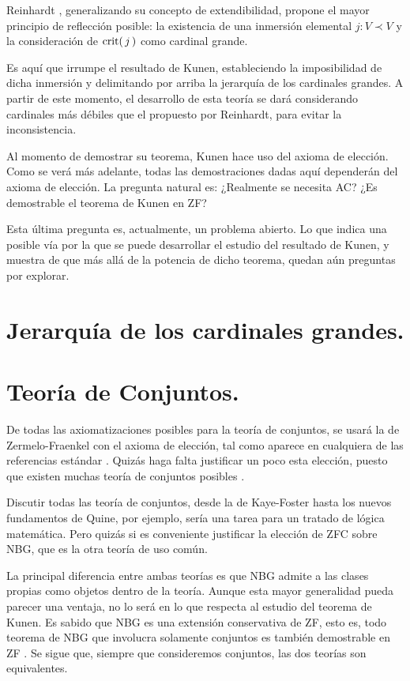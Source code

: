 Reinhardt \autocite{reinhardt_ackermanns_1970},
generalizando su concepto de extendibilidad,
propone el mayor principio de reflección posible:
la existencia de una inmersión elemental $j\colon V\prec V$
y la consideración de $\operatorname{crit} (\, j\, )$ como cardinal grande.

Es aquí que irrumpe el resultado de Kunen,
estableciendo la imposibilidad de dicha inmersión
y delimitando por arriba la jerarquía de los cardinales
grandes. A partir de este momento, el desarrollo
de esta teoría se dará considerando cardinales más
débiles que el propuesto por Reinhardt,
para evitar la inconsistencia.

Al momento de demostrar su teorema, Kunen hace
uso del axioma de elección. Como se verá
más adelante, todas las demostraciones dadas aquí
dependerán del axioma de elección.
La pregunta natural es: ¿Realmente se necesita AC?
¿Es demostrable el teorema de Kunen en ZF?

Esta última pregunta es, actualmente, un problema abierto.
Lo que indica una posible vía por la que se puede desarrollar
el estudio del resultado de Kunen, y muestra de que más allá
de la potencia de dicho teorema, quedan aún preguntas por explorar.

\section*{Jerarquía de los cardinales grandes.}

\section*{Teoría de Conjuntos.}

De todas las axiomatizaciones posibles para la teoría de conjuntos,
se usará la de Zermelo-Fraenkel con el axioma de elección, tal como
aparece en cualquiera de las referencias estándar
\autocite{kunen_set_2013,jech_set_2003}. Quizás haga falta justificar un poco
esta elección, puesto que existen muchas teoría de conjuntos posibles \autocite{ivorra_teorias_2013}.

Discutir todas las teoría de conjuntos, desde la de Kaye-Foster hasta los nuevos fundamentos
de Quine, por ejemplo, sería una tarea para un tratado de lógica matemática.
Pero quizás si es conveniente justificar la elección de ZFC sobre NBG, que es
la otra teoría de uso común.

La principal diferencia entre ambas teorías es que NBG admite a las clases propias
como objetos dentro de la teoría. Aunque esta mayor generalidad pueda parecer una ventaja,
no lo será en lo que respecta al estudio del teorema de Kunen.
Es sabido que NBG es una extensión conservativa de ZF,
esto es, todo teorema de NBG que involucra solamente conjuntos es también demostrable en ZF
\autocite[pág. 70]{jech_set_2003}.
Se sigue que, siempre que consideremos conjuntos, las dos teorías son equivalentes.

